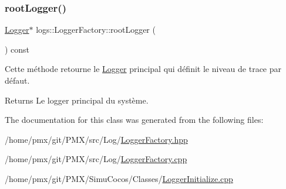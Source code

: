 \subsubsection{\texorpdfstring{root\+Logger()}{rootLogger()}}
{\footnotesize\ttfamily \hyperlink{classlogs_1_1Logger}{Logger}$\ast$ logs\+::\+Logger\+Factory\+::root\+Logger (\begin{DoxyParamCaption}{ }\end{DoxyParamCaption}) const\hspace{0.3cm}{\ttfamily [inline]}}



Cette méthode retourne le \hyperlink{classlogs_1_1Logger}{Logger} principal qui définit le niveau de trace par défaut. 

\begin{DoxyReturn}{Returns}
Le logger principal du système. 
\end{DoxyReturn}


The documentation for this class was generated from the following files\+:\begin{DoxyCompactItemize}
\item 
/home/pmx/git/\+P\+M\+X/src/\+Log/\hyperlink{LoggerFactory_8hpp}{Logger\+Factory.\+hpp}\item 
/home/pmx/git/\+P\+M\+X/src/\+Log/\hyperlink{LoggerFactory_8cpp}{Logger\+Factory.\+cpp}\item 
/home/pmx/git/\+P\+M\+X/\+Simu\+Cocos/\+Classes/\hyperlink{SimuCocos_2Classes_2LoggerInitialize_8cpp}{Logger\+Initialize.\+cpp}\end{DoxyCompactItemize}
